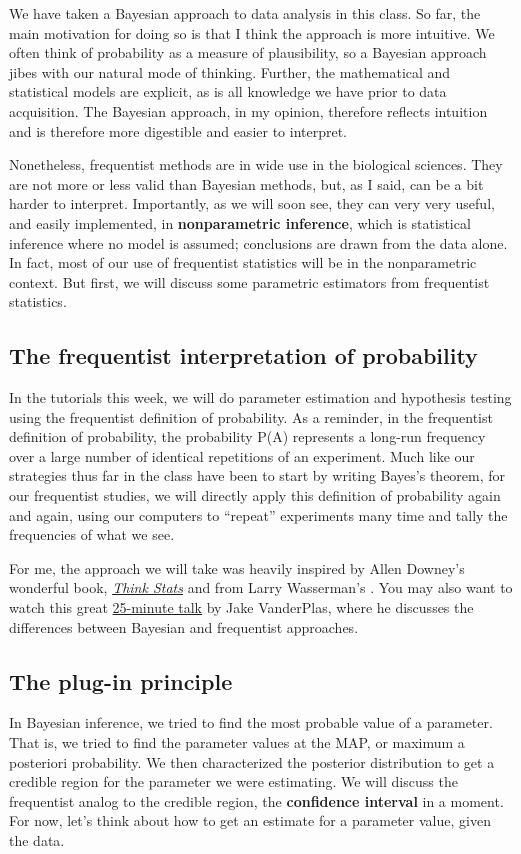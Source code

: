We have taken a Bayesian approach to data analysis in this class.  So far, the main motivation for doing so is that I think the approach is more intuitive.  We often think of probability as a measure of plausibility, so a Bayesian approach jibes with our natural mode of thinking. Further, the mathematical and statistical models are explicit, as is all knowledge we have prior to data acquisition.  The Bayesian approach, in my opinion, therefore reflects intuition and is therefore more digestible and easier to interpret.

Nonetheless, frequentist methods are in wide use in the biological sciences.  They are not more or less valid than Bayesian methods, but, as I said, can be a bit harder to interpret. Importantly, as we will soon see, they can very very useful, and easily implemented, in \textbf{nonparametric inference}, which is statistical inference where no model is assumed; conclusions are drawn from the data alone. In fact, most of our use of frequentist statistics will be in the nonparametric context. But first, we will discuss some parametric estimators from frequentist statistics.

\subsection{The frequentist interpretation of probability}
In the tutorials this week, we will do parameter estimation and hypothesis testing using the frequentist definition of probability.  As a reminder, in the frequentist definition of probability, the probability P(A) represents a long-run frequency over a large number of identical repetitions of an experiment.  Much like our strategies thus far in the class have been to start by writing Bayes's theorem, for our frequentist studies, we will directly apply this definition of probability again and again, using our computers to ``repeat'' experiments many time and tally the frequencies of what we see.

For me, the approach we will take was heavily inspired by Allen Downey's wonderful book, \href{http://greenteapress.com/thinkstats2/index.html}{\textit{Think Stats}} and from Larry Wasserman's .  You may also want to watch this great \href{https://www.youtube.com/watch?v=KhAUfqhLakw}{25-minute talk} by Jake VanderPlas, where he discusses the differences between Bayesian and frequentist approaches.

\subsection{The plug-in principle}
In Bayesian inference, we tried to find the most probable value of a parameter. That is, we tried to find the parameter values at the MAP, or maximum a posteriori probability. We then characterized the posterior distribution to get a credible region for the parameter we were estimating. We will discuss the frequentist analog to the credible region, the \textbf{confidence interval} in a moment. For now, let's think about how to get an estimate for a parameter value, given the data.

